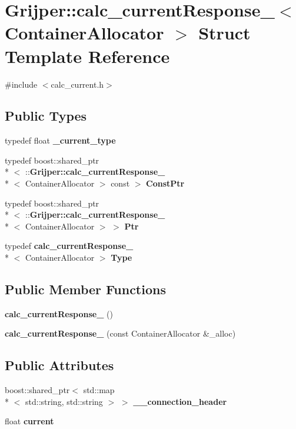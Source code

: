 \section{Grijper\-:\-:calc\-\_\-current\-Response\-\_\-$<$ Container\-Allocator $>$ Struct Template Reference}
\label{structGrijper_1_1calc__currentResponse__}


{\ttfamily \#include $<$calc\-\_\-current.\-h$>$}

\subsection*{Public Types}
\begin{DoxyCompactItemize}
\item 
typedef float {\bf \-\_\-current\-\_\-type}
\item 
typedef boost\-::shared\-\_\-ptr\\*
$<$ \-::{\bf Grijper\-::calc\-\_\-current\-Response\-\_\-}\\*
$<$ Container\-Allocator $>$ const  $>$ {\bf Const\-Ptr}
\item 
typedef boost\-::shared\-\_\-ptr\\*
$<$ \-::{\bf Grijper\-::calc\-\_\-current\-Response\-\_\-}\\*
$<$ Container\-Allocator $>$ $>$ {\bf Ptr}
\item 
typedef {\bf calc\-\_\-current\-Response\-\_\-}\\*
$<$ Container\-Allocator $>$ {\bf Type}
\end{DoxyCompactItemize}
\subsection*{Public Member Functions}
\begin{DoxyCompactItemize}
\item 
{\bf calc\-\_\-current\-Response\-\_\-} ()
\item 
{\bf calc\-\_\-current\-Response\-\_\-} (const Container\-Allocator \&\-\_\-alloc)
\end{DoxyCompactItemize}
\subsection*{Public Attributes}
\begin{DoxyCompactItemize}
\item 
boost\-::shared\-\_\-ptr$<$ std\-::map\\*
$<$ std\-::string, std\-::string $>$ $>$ {\bf \-\_\-\-\_\-connection\-\_\-header}
\item 
float {\bf current}
\end{DoxyCompactItemize}


